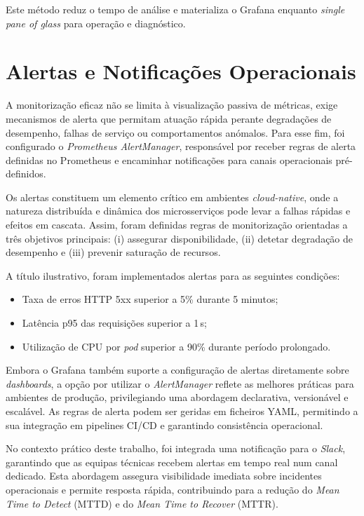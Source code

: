 Este método reduz o tempo de análise e materializa o Grafana enquanto \textit{single pane of glass} 
para operação e diagnóstico.


\section{Alertas e Notificações Operacionais}

A monitorização eficaz não se limita à visualização passiva de métricas, exige mecanismos de alerta que permitam atuação rápida perante degradações de desempenho, falhas de serviço ou comportamentos anómalos. Para esse fim, foi configurado o \textit{Prometheus AlertManager}, responsável por receber regras de alerta definidas no Prometheus e encaminhar notificações para canais operacionais pré-definidos.

Os alertas constituem um elemento crítico em ambientes \textit{cloud-native}, onde a natureza distribuída e dinâmica dos microsserviços pode levar a falhas rápidas e efeitos em cascata. Assim, foram definidas regras de monitorização orientadas a três objetivos principais: (i) assegurar disponibilidade, (ii) detetar degradação de desempenho e (iii) prevenir saturação de recursos.

A título ilustrativo, foram implementados alertas para as seguintes condições:
\begin{itemize}
    \item Taxa de erros HTTP 5xx superior a 5\% durante 5 minutos;
    \item Latência p95 das requisições superior a 1\,s;
    \item Utilização de CPU por \textit{pod} superior a 90\% durante período prolongado.
\end{itemize}

Embora o Grafana também suporte a configuração de alertas diretamente sobre \textit{dashboards}, a opção por utilizar o \textit{AlertManager} reflete as melhores práticas para ambientes de produção, privilegiando uma abordagem declarativa, versionável e escalável. As regras de alerta podem ser geridas em ficheiros YAML, permitindo a sua integração em pipelines CI/CD e garantindo consistência operacional.

No contexto prático deste trabalho, foi integrada uma notificação para o \textit{Slack}, garantindo que as equipas técnicas recebem alertas em tempo real num canal dedicado. Esta abordagem assegura visibilidade imediata sobre incidentes operacionais e permite resposta rápida, contribuindo para a redução do \textit{Mean Time to Detect} (MTTD) e do \textit{Mean Time to Recover} (MTTR).

